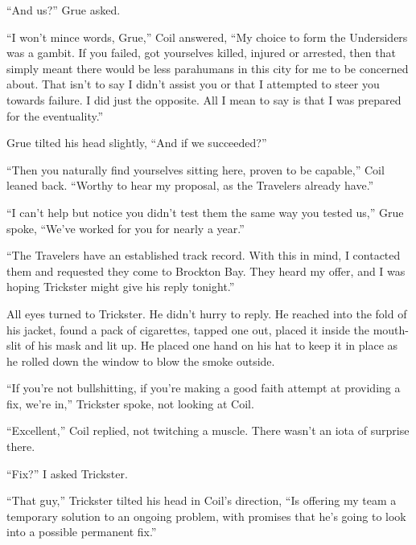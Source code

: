 ``And us?'' Grue asked.



``I won't mince words, Grue,'' Coil answered, ``My choice to form the Undersiders was a gambit.  If you failed, got yourselves killed, injured or arrested, then that simply meant there would be less parahumans in this city for me to be concerned about.  That isn't to say I didn't assist you or that I attempted to steer you towards failure.  I did just the opposite.  All I mean to say is that I was prepared for the eventuality.''



Grue tilted his head slightly, ``And if we succeeded?''



``Then you naturally find yourselves sitting here, proven to be capable,'' Coil leaned back.  ``Worthy to hear my proposal, as the Travelers already have.''



``I can't help but notice you didn't test them the same way you tested us,'' Grue spoke, ``We've worked for you for nearly a year.''



``The Travelers have an established track record.  With this in mind, I contacted them and requested they come to Brockton Bay.  They heard my offer, and I was hoping Trickster might give his reply tonight.''



All eyes turned to Trickster.  He didn't hurry to reply.  He reached into the fold of his jacket, found a pack of cigarettes, tapped one out, placed it inside the mouth-slit of his mask and lit up.  He placed one hand on his hat to keep it in place as he rolled down the window to blow the smoke outside.



``If you're not bullshitting, if you're making a good faith attempt at providing a fix, we're in,'' Trickster spoke, not looking at Coil.



``Excellent,'' Coil replied, not twitching a muscle.  There wasn't an iota of surprise there.



``Fix?'' I asked Trickster.



``That guy,'' Trickster tilted his head in Coil's direction, ``Is offering my team a temporary solution to an ongoing problem, with promises that he's going to look into a possible permanent fix.''



